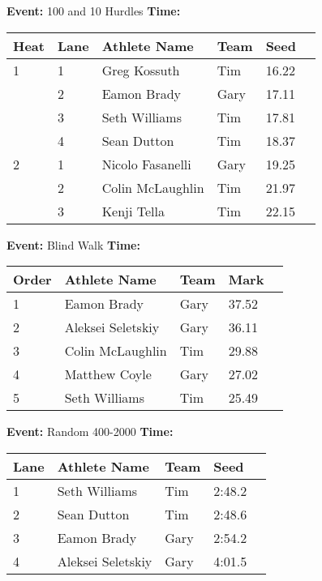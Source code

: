\documentclass[10pt]{article}
\begin{document}
\twocolumn


\textbf{Event:} 100 and 10 Hurdles \quad \textbf{Time:}  

\vspace{1em}
\begin{tabular}{@{}llllll@{}}
\toprule
\textbf{{Heat}} &
\textbf{Lane} & \textbf{Athlete Name} & \textbf{Team} & \textbf{Seed} \\
\midrule
1 & 1 & Greg Kossuth & Tim & 16.22 &\\
 & 2 & Eamon Brady & Gary & 17.11 &\\
 & 3 & Seth Williams & Tim & 17.81 &\\
 & 4 & Sean Dutton & Tim & 18.37 &\\
2 & 1 & Nicolo Fasanelli & Gary & 19.25 &\\
 & 2 & Colin McLaughlin & Tim & 21.97 &\\
 & 3 & Kenji Tella & Tim & 22.15 &\\
\bottomrule
\end{tabular}
\vspace{2.5em}


\textbf{Event:} Blind Walk \quad \textbf{Time:}  

\vspace{1em}
\begin{tabular}{@{}lllll@{}}
\toprule

\textbf{Order} & \textbf{Athlete Name} & \textbf{Team} & \textbf{Mark} \\
\midrule
1 & Eamon Brady & Gary & 37.52 &\\
2 & Aleksei Seletskiy & Gary & 36.11 &\\
3 & Colin McLaughlin & Tim & 29.88 &\\
4 & Matthew Coyle & Gary & 27.02 &\\
5 & Seth Williams & Tim & 25.49 &\\
\bottomrule
\end{tabular}
\vspace{2.5em}


\textbf{Event:} Random 400-2000 \quad \textbf{Time:}  

\vspace{1em}
\begin{tabular}{@{}lllll@{}}
\toprule

\textbf{Lane} & \textbf{Athlete Name} & \textbf{Team} & \textbf{Seed} \\
\midrule
1 & Seth Williams & Tim & 2:48.2 &\\
2 & Sean Dutton & Tim & 2:48.6 &\\
3 & Eamon Brady & Gary & 2:54.2 &\\
4 & Aleksei Seletskiy & Gary & 4:01.5 &\\
\bottomrule
\end{tabular}
\vspace{2.5em}
\end{document}
